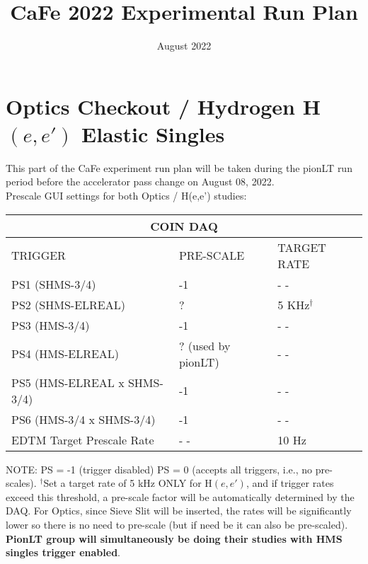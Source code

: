 \documentclass{article}
\title{CaFe 2022 Experimental Run Plan}
\date{August 2022}
\begin{document}
\maketitle

\section{Optics Checkout / Hydrogen H$(e,e')$ Elastic Singles}
This part of the CaFe experiment run plan will be taken during the pionLT run period
before the accelerator pass change on August 08, 2022.\\

Prescale GUI settings for both Optics / H(e,e') studies:
    
    \begin{center}
    \begin{tabular}{ |p{6cm}| |p{3cm}| |p{3cm}| }
    \hline
    \multicolumn{3}{|c|}{COIN DAQ} \\
    \hline
    TRIGGER & PRE-SCALE & TARGET RATE\\
    \hline
    PS1 (SHMS-3/4)    & -1  & - - \\
    PS2 (SHMS-ELREAL) &  ?  & 5 KHz$^{\dagger}$ \\
    PS3 (HMS-3/4)     & -1  & - -\\
    PS4 (HMS-ELREAL)  & ? (used by pionLT)  & - - \\
    PS5 (HMS-ELREAL x SHMS-3/4)  & -1 & - -  \\
    PS6 (HMS-3/4 x SHMS-3/4)     & -1 & - -  \\
    \hline
    EDTM Target Prescale Rate & - - & 10 Hz \\
    \hline
    \end{tabular}
    \end{center}
    NOTE: PS = -1 (trigger disabled) PS = 0 (accepts all triggers, i.e., no pre-scales). $^{\dagger}$Set a target rate of 5 kHz ONLY for H$(e,e')$,  and if trigger rates exceed this threshold, 
    a pre-scale factor will be automatically determined by the DAQ. For Optics, since
    Sieve Slit will be inserted, the rates will be significantly lower so there is no need to pre-scale (but if need be
    it can also be pre-scaled). \textbf{PionLT group will simultaneously be doing their studies with HMS singles trigger enabled}.
    
\end{document}
